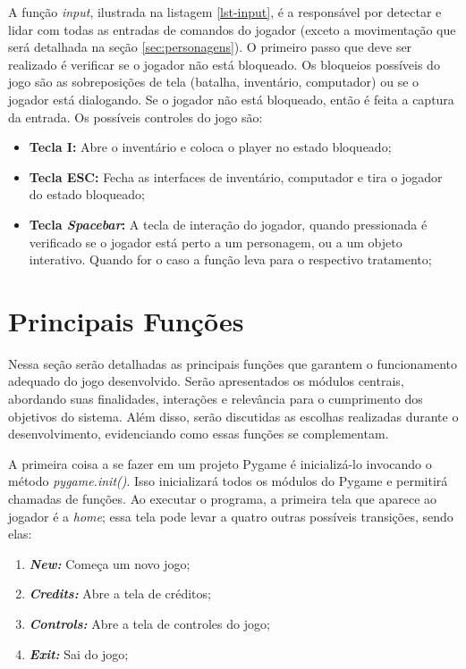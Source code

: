 A função \textit{input}, ilustrada na listagem \ref{lst-input}, é a responsável por detectar e lidar com todas as entradas de comandos do jogador (exceto a movimentação que será detalhada na seção \ref{sec:personagens}). 
O primeiro passo que deve ser realizado é verificar se o jogador não está bloqueado. Os bloqueios possíveis do jogo são as sobreposições de tela (batalha, inventário, computador) ou se o jogador está dialogando.  
Se o jogador não está bloqueado, então é feita a captura da entrada. Os possíveis controles do jogo são:
\begin{itemize}
    \item \textbf{Tecla I: }Abre o inventário e coloca o player no estado bloqueado;
    \item \textbf{Tecla ESC: }Fecha as interfaces de inventário, computador e tira o jogador do estado bloqueado;
    \item \textbf{Tecla \textit{Spacebar}: }A tecla de interação do jogador, quando pressionada é verificado se o jogador está perto a um personagem, ou a um objeto interativo. Quando for o caso a função leva para o respectivo tratamento;
\end{itemize}

 

\section{Principais Funções}
\label{sec:principais-funcoes}
Nessa seção serão detalhadas as principais funções que garantem o funcionamento adequado do jogo desenvolvido. Serão apresentados os módulos centrais, abordando suas finalidades, interações e relevância para o cumprimento dos objetivos do sistema. Além disso, serão discutidas as escolhas realizadas durante o desenvolvimento, evidenciando como essas funções se complementam.

A primeira coisa a se fazer em um projeto Pygame é inicializá-lo invocando o método \textit{pygame.init()}. Isso inicializará todos os módulos do Pygame e permitirá chamadas de funções. Ao executar o programa, a primeira tela que aparece ao jogador é a \textit{home}; essa tela pode levar a quatro outras possíveis transições, sendo elas:
\begin{enumerate}
    \item \textbf{\textit{New: }} Começa um novo jogo;
    \item \textbf{\textit{Credits: }} Abre a tela de créditos;
    \item \textbf{\textit{Controls: }} Abre a tela de controles do jogo;
    \item \textbf{\textit{Exit: }} Sai do jogo;
\end{enumerate}

